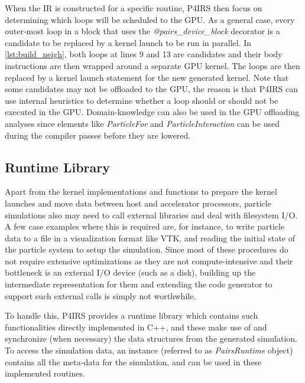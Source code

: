 \documentclass[Afour,sageh,times]{sagej}
\newcommand{\RMchange}[1]{{\color{blue} #1}}
\begin{document}
\RMchange{When} the IR is constructed for a specific routine, P4IRS then focus on determining which loops will be scheduled to the GPU.
As a general case, every outer-most loop in a block that uses the \emph{@pairs\_device\_block} decorator is a candidate to be replaced by a kernel launch to be run in parallel.
In \autoref{lst:build_neigh}, both loops at lines 9 and 13 are candidates and their body instructions are then wrapped around a separate GPU kernel.
The loops are then replaced by a kernel launch statement for the new generated kernel.
Note that some candidates may not be offloaded to the GPU, the reason is that P4IRS can use internal heuristics to determine whether a loop should or should not be executed in the GPU.
Domain-knowledge can also be used in the GPU offloading analyses since elements like \emph{ParticleFor} and \emph{ParticleInteraction} can be used during the compiler passes before they are lowered.

\subsection{Runtime \RMchange{Library}}

Apart from the kernel implementations and functions to prepare the kernel launches and move data between host and accelerator processors, particle simulations also may need to call external libraries and deal with filesystem I/O.
A few case examples where this is required are, for instance, to write particle data to a file in a visualization format like VTK, and reading the initial state of the particle system to setup the simulation.
Since most of these procedures do not require extensive optimizations as they are not compute-intensive and their bottleneck is an external I/O device (such as a disk), building up the intermediate representation for them and extending the code generator to support such external calls is simply not worthwhile.

To handle this, P4IRS provides a runtime library which contains such functionalities directly implemented in C++, and these make use of and synchronize (when necessary) the data structures from the generated simulation.
To access the simulation data, an instance (referred to as \emph{PairsRuntime} object) contains all the meta-data for the simulation, and can be used in these implemented routines.
\end{document}
